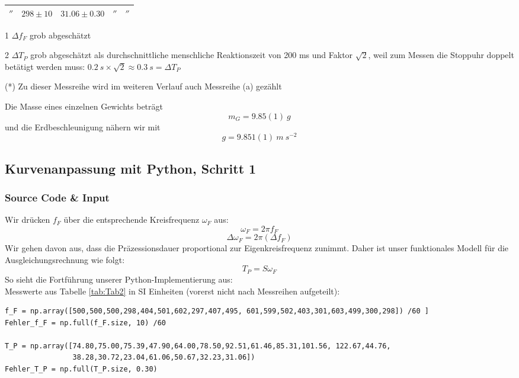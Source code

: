 \documentclass[a4paper,10pt]{article}
\begin{document}
\begin{table}[htb]
\begin{threeparttable}
\begin{tabular}{ccccc}
\(''\)&\(298\pm10\)&\(31.06\pm0.30\)&\(''\)&\(''\)\\
\bottomrule
 \end{tabular}
\begin{tablenotes}
\raggedright
\item[1] \boldmath\(\Delta f_{F} \) grob abgeschätzt\unboldmath
\item[2] \boldmath\(\Delta T_{P} \) grob abgeschätzt als durchschnittliche menschliche  Reaktionszeit von 200 ms und Faktor \(\sqrt{2}\), weil zum Messen die Stoppuhr doppelt betätigt werden muss:  \(0.2\:s\times\sqrt{2}\approx0.3\:s = \Delta T_{P} \)\unboldmath
\item[(*)] Zu dieser Messreihe wird im weiteren Verlauf auch Messreihe (a) gezählt
\end{tablenotes}
\end{threeparttable}\end{table}
\boldmath
Die Masse eines einzelnen Gewichts beträgt
\[m_{G}=9.85(1)\:g\]
und die Erdbeschleunigung nähern wir mit
\[g=9.851(1)\:m\:s^{-2}\]
\subsection{Kurvenanpassung mit Python, Schritt 1}
\subsubsection{Source Code \& Input}
Wir drücken \(f_F\) über die entsprechende Kreisfrequenz \(\omega_{F}\) aus:
\begin{equation} \label{eq:omega_F}
	\omega_{F}=2\pi f_{F}
\end{equation} 
\begin{equation} \label{eq:Deltaomega_F}
	\Delta\omega_{F}=2\pi (\Delta f_{F})
\end{equation} 
Wir gehen davon aus, dass die Präzessionsdauer proportional zur Eigenkreisfrequenz zunimmt.
Daher ist unser funktionales Modell für die Ausgleichungsrechnung wie folgt:
\begin{equation} \label{eq:Fit2}
	\boxed{T_P = S \omega_{F}}
\end{equation} 
So sieht die Fortführung unserer Python-Implementierung aus:\\

Messwerte aus Tabelle \ref{tab:Tab2} in SI Einheiten (vorerst nicht nach Messreihen aufgeteilt):
\begin{lstlisting}
f_F = np.array([500,500,500,298,404,501,602,297,407,495, 601,599,502,403,301,603,499,300,298]) /60 ]
Fehler_f_F = np.full(f_F.size, 10) /60

T_P = np.array([74.80,75.00,75.39,47.90,64.00,78.50,92.51,61.46,85.31,101.56, 122.67,44.76,
                38.28,30.72,23.04,61.06,50.67,32.23,31.06]) 
Fehler_T_P = np.full(T_P.size, 0.30)

\end{lstlisting}
\end{document}
